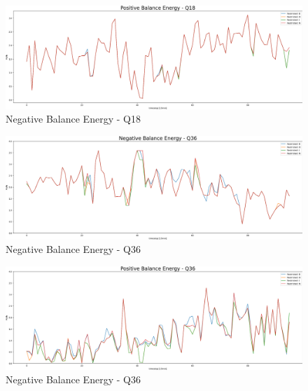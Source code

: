 \begin{figure}[!h]
	\includegraphics[width=1\linewidth]{pictures/results/Positive Balance Energy - Q18.png}
	\caption{Negative Balance Energy - Q18}
	\label{fig:Negative Balance Energy - Q18}
\end{figure}




\begin{figure}[!h]
	\includegraphics[width=1\linewidth]{pictures/results/Negative Balance Energy - Q36.png}
	\caption{Negative Balance Energy - Q36}
	\label{fig:Negative Balance Energy - Q36}
\end{figure}

\begin{figure}[!h]
	\includegraphics[width=1\linewidth]{pictures/results/Positive Balance Energy - Q36.png}
	\caption{Negative Balance Energy - Q36}
	\label{fig:Negative Balance Energy - Q36}
\end{figure}


